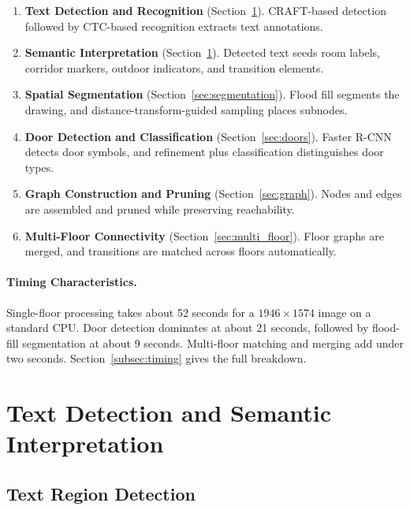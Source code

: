 \documentclass[manuscript,screen,review]{acmart}
\begin{document}
\begin{enumerate}
    \item \textbf{Text Detection and Recognition} (Section~\ref{sec:text_detection}). CRAFT-based detection followed by CTC-based recognition extracts text annotations.
    \item \textbf{Semantic Interpretation} (Section~\ref{sec:text_detection}). Detected text seeds room labels, corridor markers, outdoor indicators, and transition elements.
    \item \textbf{Spatial Segmentation} (Section~\ref{sec:segmentation}). Flood fill segments the drawing, and distance-transform-guided sampling places subnodes.
    \item \textbf{Door Detection and Classification} (Section~\ref{sec:doors}). Faster R-CNN detects door symbols, and refinement plus classification distinguishes door types.
    \item \textbf{Graph Construction and Pruning} (Section~\ref{sec:graph}). Nodes and edges are assembled and pruned while preserving reachability.
    \item \textbf{Multi-Floor Connectivity} (Section~\ref{sec:multi_floor}). Floor graphs are merged, and transitions are matched across floors automatically.
\end{enumerate}

\paragraph{Timing Characteristics.}
Single-floor processing takes about 52 seconds for a $1946 \times 1574$ image on a standard CPU. Door detection dominates at about 21 seconds, followed by flood-fill segmentation at about 9 seconds. Multi-floor matching and merging add under two seconds. Section~\ref{subsec:timing} gives the full breakdown.

\section{Text Detection and Semantic Interpretation}
\label{sec:text_detection}

\subsection{Text Region Detection}
\label{subsec:detection}
\end{document}
